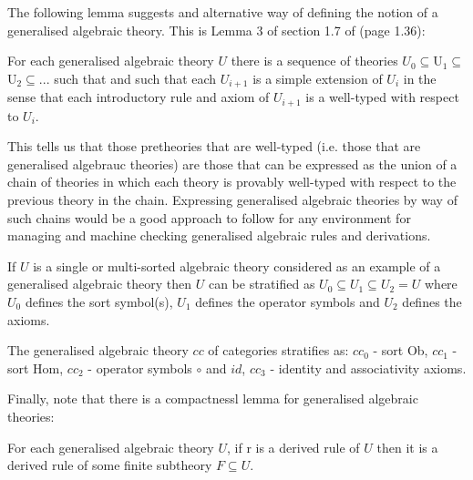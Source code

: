 The following lemma suggests and alternative way of defining the notion of a generalised algebraic theory. 
This is Lemma 3 of section 1.7 of \cite{Cartmell78} (page 1.36):
\begin{lemma}
 For each generalised algebraic theory $U$  there is a sequence of theories 
$U_0 \subseteq $U$_1 \subseteq $U$_2 \subseteq ...$ such that  
and such that each $U_{i+1}$ is a simple extension of $U_i$ in the sense that each introductory rule and axiom of $U_{i+1}$ is a well-typed  with respect to $U_i$.
\end{lemma}
This tells us that those pretheories that are well-typed (i.e. those that are generalised algebrauc theories) are those that can be expressed as the union of a chain of theories in which each theory is provably well-typed with respect to the previous theory in the chain.  
Expressing generalised algebraic theories by way of such chains would be a good approach to follow
for any environment for managing and machine checking generalised algebraic  rules and derivations.

\begin{example}
If $U$ is a single or multi-sorted algebraic theory considered as an example of a
 generalised algebraic theory then $U$ can be stratified as $U_0 \subseteq U_1 \subseteq U_2=U$
where $U_0$ defines the sort symbol(s), $U_1$ defines the operator symbols and $U_2$ defines the axioms. 
\end{example}

\begin{example}
 The generalised algebraic theory $cc$ of categories stratifies as: $cc_0$ - sort Ob,
$cc_1$ - sort Hom, $cc_2$ - operator symbols $\circ$ and $id$, $cc_3$ - identity and associativity axioms.
\end{example} 

 Finally, note that there is a compactnessl lemma for generalised algebraic theories:
\begin{lemma}
For each generalised algebraic theory $U$, if r is a derived rule of $U$ then it is a derived rule of some finite subtheory $F \subseteq U$. \
\end{lemma}



